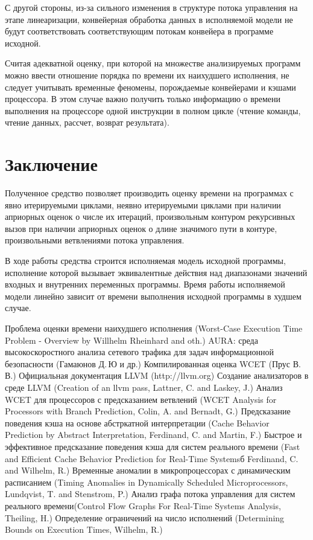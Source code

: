 \documentclass[12pt,a4paper]{article}
\begin{document}
С другой стороны, из-за сильного изменения в структуре потока управления на этапе линеаризации, конвейерная обработка данных в исполняемой модели не будут соответствовать соответствующим потокам конвейера в программе исходной.

Считая адекватной оценку, при которой на множестве анализируемых программ можно ввести отношение порядка по времени их наихудшего исполнения, не следует учитывать временные феномены, порождаемые конвейерами и кэшами процессора. В этом случае важно получить только информацию о времени выполнения на процессоре одной инструкции в полном цикле (чтение команды, чтение данных, рассчет, возврат результата).
\newpage
\section{Заключение}

Полученное средство позволяет производить оценку времени на программах с явно итерируемыми циклами, неявно итерируемыми циклами при наличии априорных оценок о числе их итераций, произвольным контуром рекурсивных вызов при наличии априорных оценок о длине значимого пути в контуре, произвольными ветвлениями потока управления.

В ходе работы средства строится исполняемая модель исходной программы, исполнение которой вызывает эквивалентные действия над диапазонами значений входных и внутренних переменных программы. Время работы исполняемой модели линейно зависит от времени выполнения исходной программы в худшем случае.

\newpage
\begin{thebibliography}{99}
Проблема оценки времени наихудшего исполнения (Worst-Case Execution Time Problem - Overview by Willhelm Rheinhard and oth.)
AURA: среда высокоскоростного анализа сетевого трафика для задач информационной безопасности (Гамаюнов Д.\,Ю и др.)
Компилированная оценка WCET (Прус В.\,В.)
Официальная документация LLVM (http://llvm.org)
Создание анализаторов в среде LLVM (Creation of an llvm pass, Lattner, C. and Laskey, J.)
Анализ WCET для процессоров с предсказанием ветвлений (WCET Analysis for Processors with Branch Prediction, Colin, A. and Bernadt, G.)
Предсказание поведения кэша на основе абстркатной интерпретации (Cache Behavior Prediction by Abstract Interpretation, Ferdinand, C. and Martin, F.)
Быстрое и эффективное предсказание поведения кэша для систем реального времени (Fast and Efficient Cache Behavior Prediction for Real-Time Systemsб Ferdinand, C. and Wilhelm, R.)
Временные аномалии в микропроцессорах с динамическим расписанием (Timing Anomalies in Dynamically Scheduled Microprocessors, Lundqvist, T. and Stenstrom, P.)
Анализ графа потока управления для систем реального времени(Control Flow Graphs For Real-Time Systems Analysis, Theiling, H.)
Определение ограничений на число исполнений (Determining Bounds on Execution Times, Wilhelm, R.)

\end{thebibliography}
\end{document}
